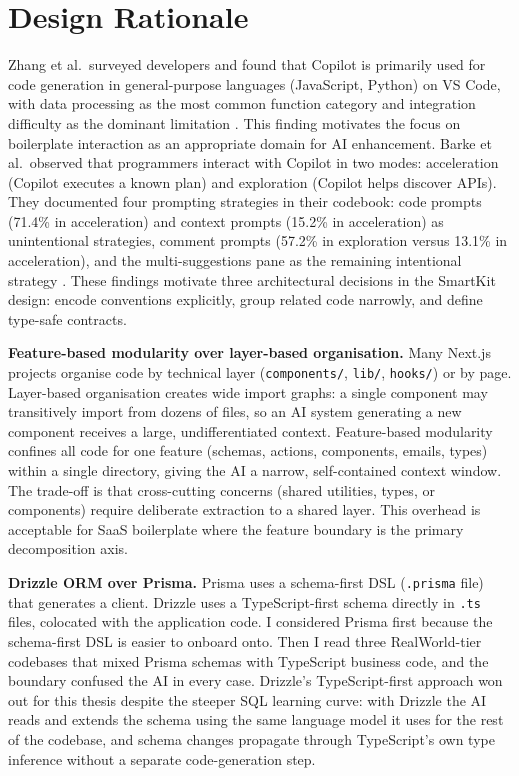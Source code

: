 \documentclass[12pt,a4paper]{report}
\DeclareRobustCommand{\filename}[1]{\bgroup\urlstyle{tt}\nolinkurl{#1}\egroup}
\begin{document}
\section{Design Rationale}

Zhang et al.\ surveyed developers and found that Copilot is primarily used for code generation in general-purpose languages (JavaScript, Python) on VS Code, with data processing as the most common function category and integration difficulty as the dominant limitation \parencite{zhang2023practices}. This finding motivates the focus on boilerplate interaction as an appropriate domain for AI enhancement. Barke et al.\ observed that programmers interact with Copilot in two modes: acceleration (Copilot executes a known plan) and exploration (Copilot helps discover APIs). They documented four prompting strategies in their codebook: code prompts (71.4\% in acceleration) and context prompts (15.2\% in acceleration) as unintentional strategies, comment prompts (57.2\% in exploration versus 13.1\% in acceleration), and the multi-suggestions pane as the remaining intentional strategy \parencite{barke2022grounded}. These findings motivate three architectural decisions in the SmartKit design: encode conventions explicitly, group related code narrowly, and define type-safe contracts.

\textbf{Feature-based modularity over layer-based organisation.} Many Next.js projects organise code by technical layer (\filename{components/}, \filename{lib/}, \filename{hooks/}) or by page. Layer-based organisation creates wide import graphs: a single component may transitively import from dozens of files, so an AI system generating a new component receives a large, undifferentiated context. Feature-based modularity confines all code for one feature (schemas, actions, components, emails, types) within a single directory, giving the AI a narrow, self-contained context window. The trade-off is that cross-cutting concerns (shared utilities, types, or components) require deliberate extraction to a shared layer. This overhead is acceptable for SaaS boilerplate where the feature boundary is the primary decomposition axis.

\textbf{Drizzle ORM over Prisma.} Prisma uses a schema-first DSL (\filename{.prisma} file) that generates a client. Drizzle uses a TypeScript-first schema directly in \filename{.ts} files, colocated with the application code. I considered Prisma first because the schema-first DSL is easier to onboard onto. Then I read three RealWorld-tier codebases that mixed Prisma schemas with TypeScript business code, and the boundary confused the AI in every case. Drizzle's TypeScript-first approach won out for this thesis despite the steeper SQL learning curve: with Drizzle the AI reads and extends the schema using the same language model it uses for the rest of the codebase, and schema changes propagate through TypeScript's own type inference without a separate code-generation step.
\end{document}
